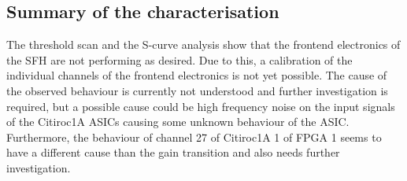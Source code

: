 \subsection{Summary of the characterisation}
The threshold scan and the S-curve analysis show that the frontend electronics of the SFH are not performing as desired.
Due to this, a calibration of the individual channels of the frontend electronics is not yet possible.
The cause of the observed behaviour is currently not understood and further investigation is required,
but a possible cause could be high frequency noise on the input signals of the Citiroc1A ASICs causing some unknown behaviour of the ASIC.
Furthermore, the behaviour of channel 27 of Citiroc1A 1 of FPGA 1 seems to have a different cause than the gain transition and also needs further investigation.

